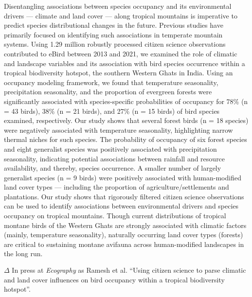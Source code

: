 \small{
    Disentangling associations between species occupancy and its environmental drivers --- climate and land cover --- along tropical mountains is imperative to predict species distributional changes in the future.
    Previous studies have primarily focused on identifying such associations in temperate mountain systems.
    Using 1.29 million robustly processed citizen science observations contributed to eBird between 2013 and 2021, we examined the role of climatic and landscape variables and its association with bird species occurrence within a tropical biodiversity hotspot, the southern Western Ghats in India.
    Using an occupancy modeling framework, we found that temperature seasonality, precipitation seasonality, and the proportion of evergreen forests were significantly associated with species-specific probabilities of occupancy for 78\% (n = 43 birds), 38\% (n = 21 birds), and 27\% (n = 15 birds) of bird species examined, respectively.
    Our study shows that several forest birds (n = 18 species) were negatively associated with temperature seasonality, highlighting narrow thermal niches for such species.
    The probability of occupancy of six forest species and eight generalist species was positively associated with precipitation seasonality, indicating potential associations between rainfall and resource availability, and thereby, species occurrence.
    A smaller number of largely generalist species (n = 9 birds) were positively associated with human-modified land cover types --- including the proportion of agriculture/settlements and plantations.
    Our study shows that rigorously filtered citizen science observations can be used to identify associations between environmental drivers and species occupancy on tropical mountains.
    Though current distributions of tropical montane birds of the Western Ghats are strongly associated with climatic factors (mainly, temperature seasonality), naturally occurring land cover types (forests) are critical to sustaining montane avifauna across human-modified landscapes in the long run.

    \bigskip

    {\noindent \large{$\Delta$}} \normalfont In press at \textit{Ecography} as Ramesh et al. ``Using citizen science to parse climatic and land cover influences on bird occupancy within a tropical biodiversity hotspot''.
}

\clearpage


